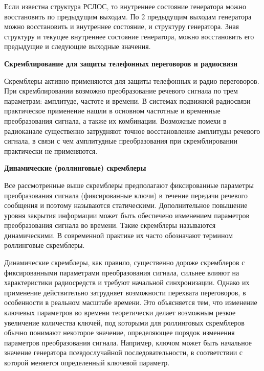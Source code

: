 Если известна структура РСЛОС, то внутреннее состояние генератора можно восстановить по  предыдущим выходам. По 2 предыдущим выходам генератора можно восстановить и внутреннее состояние, и структуру генератора. Зная структуру и текущее внутреннее состояние генератора, можно восстановить его предыдущие и следующие выходные значения.


   \begin{center}
  \large
 \bf Скремблирование для защиты телефонных переговоров и радиосвязи
 \end{center}

Скремблеры активно применяются для защиты телефонных и радио переговоров. При скремблировании возможно преобразование речевого сигнала по трем параметрам: амплитуде, частоте и времени. В системах подвижной радиосвязи практическое применение нашли в основном частотные и временные преобразования сигнала, а также их комбинации. Возможные помехи в радиоканале существенно затрудняют точное восстановление амплитуды речевого сигнала, в связи с чем амплитудные преобразования при скремблировании практически не применяются.

   \begin{center}
  \large
 \bf Динамические (роллинговые) скремблеры
 \end{center}

Все рассмотренные выше скремблеры предполагают фиксированные параметры преобразования сигнала (фиксированные ключи) в течение передачи речевого сообщения и поэтому называются статическими.
Дополнительное повышение уровня закрытия информации может быть обеспечено изменением параметров преобразования сигнала во времени. Такие скремблеры называются динамическими. В современной практике их часто обозначают термином роллинговые скремблеры.

Динамические скремблеры, как правило, существенно дороже скремблеров с фиксированными параметрами преобразования сигнала, сильнее влияют на характеристики радиосредств и требуют начальной синхронизации. Однако их применение действительно затрудняет возможности перехвата переговоров, в особенности в реальном масштабе времени. Это объясняется тем, что изменение ключевых параметров во времени теоретически делает возможным резкое увеличение количества ключей, под которыми для роллинговых скремблеров обычно понимают некоторое значение, определяющее порядок изменения параметров преобразования сигнала. Например, ключом может быть начальное значение генератора псевдослучайной последовательности, в соответствии с которой меняется определенный ключевой параметр.

